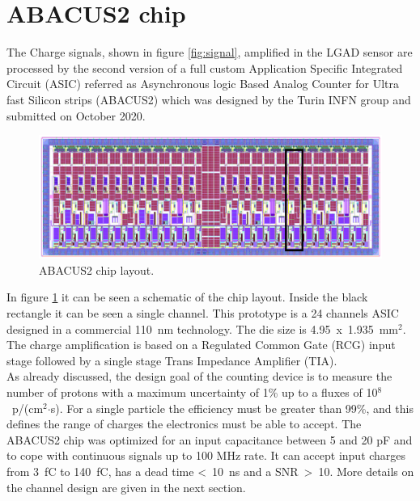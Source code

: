 \section{ABACUS2 chip}\label{chip}
\noindent The Charge signals, shown in figure \ref{fig:signal}, amplified in the LGAD sensor are processed by the second version of a full custom Application Specific Integrated Circuit (ASIC) referred as Asynchronous logic Based Analog Counter for Ultra fast Silicon strips (ABACUS2)\cite{abacus}\cite{dac} which was designed by the Turin INFN group and submitted on October 2020.
\begin{figure}[H]
	\centering
	\includegraphics[width=0.9\linewidth]{IMG/ch2/ABACUS2.png}
	\caption{ABACUS2 chip layout.}
	\label{fig:abacus2}
\end{figure}
\noindent In figure \ref{fig:abacus2} it can be seen a schematic of the chip layout.
Inside the black rectangle it can be seen a single channel.
This prototype is a 24 channels ASIC designed in a commercial 110~nm technology.
The die size is 4.95~x~1.935~mm$^2$.
The charge amplification is based on a Regulated Common Gate (RCG) input stage followed by a single stage Trans Impedance Amplifier (TIA).\\
As already discussed, the design goal of the counting device is to measure the number of protons with a maximum uncertainty of 1\% up to a fluxes of 10$^8$~p/(cm$^2$$\cdot$s).
For a single particle the efficiency must be greater than 99\%, and this defines the range of charges the electronics must be able to accept.
The ABACUS2 chip was optimized for an input capacitance between 5 and 20 pF and to cope with continuous signals up to 100 MHz rate.
It can accept input charges from 3~fC to 140~fC, has a dead time <~10~ns and a SNR~>~10.
More details on the channel design are given in the next section. 

